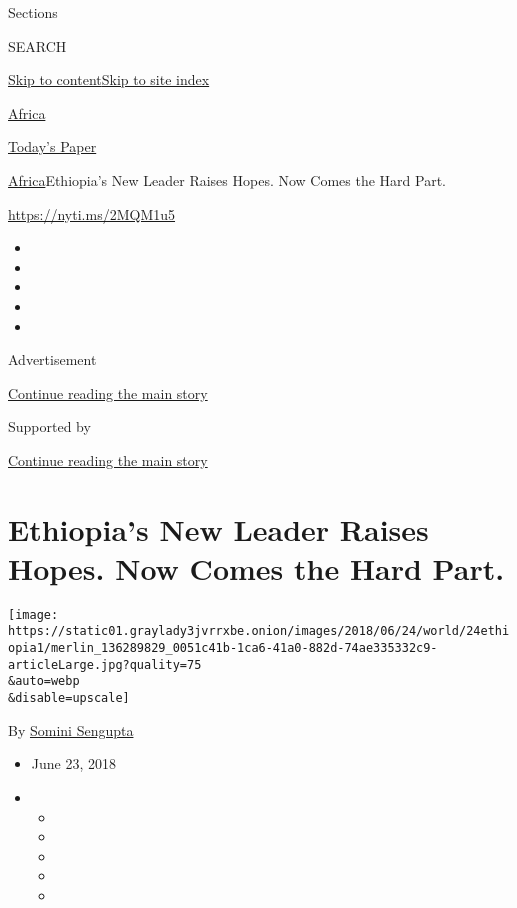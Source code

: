 Sections

SEARCH

\protect\hyperlink{site-content}{Skip to
content}\protect\hyperlink{site-index}{Skip to site index}

\href{https://www.nytimes3xbfgragh.onion/section/world/africa}{Africa}

\href{https://myaccount.nytimes3xbfgragh.onion/auth/login?response_type=cookie\&client_id=vi}{}

\href{https://www.nytimes3xbfgragh.onion/section/todayspaper}{Today's
Paper}

\href{/section/world/africa}{Africa}\textbar{}Ethiopia's New Leader
Raises Hopes. Now Comes the Hard Part.

\url{https://nyti.ms/2MQM1u5}

\begin{itemize}
\item
\item
\item
\item
\item
\end{itemize}

Advertisement

\protect\hyperlink{after-top}{Continue reading the main story}

Supported by

\protect\hyperlink{after-sponsor}{Continue reading the main story}

\hypertarget{ethiopias-new-leader-raises-hopes-now-comes-the-hard-part}{%
\section{Ethiopia's New Leader Raises Hopes. Now Comes the Hard
Part.}\label{ethiopias-new-leader-raises-hopes-now-comes-the-hard-part}}

\texttt{[image: https://static01.graylady3jvrrxbe.onion/images/2018/06/24/world/24ethiopia1/merlin\_136289829\_0051c41b-1ca6-41a0-882d-74ae335332c9-articleLarge.jpg?quality=75\\\&auto=webp\\\&disable=upscale]}

By \href{http://www.nytimes3xbfgragh.onion/by/somini-sengupta}{Somini
Sengupta}

\begin{itemize}
\item
  June 23, 2018
\item
  \begin{itemize}
  \item
  \item
  \item
  \item
  \item
  \end{itemize}
\end{itemize}

